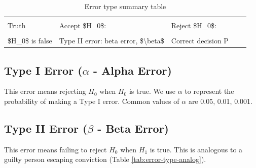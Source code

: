 \documentclass[
]{book}
\begin{document}
\begin{table}
\centering
\caption{\label{tab:error-type}Error type summary table}
\centering
\begin{tabular}[t]{>{\raggedright\arraybackslash}p{8em}||>{\raggedright\arraybackslash}p{15em}||>{\raggedright\arraybackslash}p{15em}}
\hline
{} &  \\
Truth & Accept \$H\_0\$: & Reject \$H\_0\$:\\
\hline
{} &  & \\
\hline
\$H\_0\$ is false & Type II error: beta error, \$\textbackslash{}beta\$ & Correct decision P
 &  & \\
\hline
\end{tabular}
\end{table}

\subsection{\texorpdfstring{Type I Error (\(\alpha\) - Alpha Error)}{Type I Error (\textbackslash alpha - Alpha Error)}}\label{type-i-error-alpha---alpha-error}

This error means rejecting \(H_0\) when \(H_0\) is true. We use \(\alpha\) to represent the probability of making a Type I error. Common values of \(\alpha\) are 0.05, 0.01, 0.001.

\subsection{\texorpdfstring{Type II Error (\(\beta\) - Beta Error)}{Type II Error (\textbackslash beta - Beta Error)}}\label{type-ii-error-beta---beta-error}

This error means failing to reject \(H_0\) when \(H_1\) is true. This is analogous to a guilty person escaping conviction (Table \ref{tab:error-type-analog}).
\end{document}
